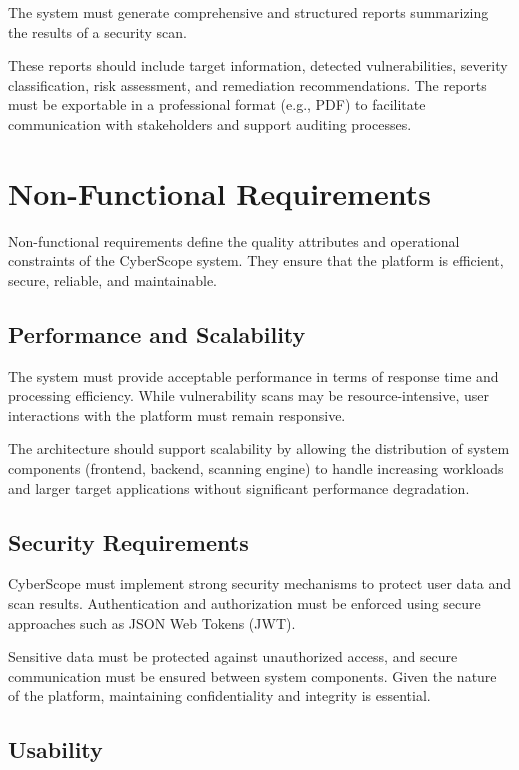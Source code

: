 \indent The system must generate comprehensive and structured reports summarizing the results of a security scan.

\indent These reports should include target information, detected vulnerabilities, severity classification, risk assessment, and remediation recommendations. The reports must be exportable in a professional format (e.g., PDF) to facilitate communication with stakeholders and support auditing processes.

\section{Non-Functional Requirements}

\indent Non-functional requirements define the quality attributes and operational constraints of the CyberScope system. They ensure that the platform is efficient, secure, reliable, and maintainable.

\subsection{Performance and Scalability}

\indent The system must provide acceptable performance in terms of response time and processing efficiency. While vulnerability scans may be resource-intensive, user interactions with the platform must remain responsive.

\indent The architecture should support scalability by allowing the distribution of system components (frontend, backend, scanning engine) to handle increasing workloads and larger target applications without significant performance degradation.

\subsection{Security Requirements}

\indent CyberScope must implement strong security mechanisms to protect user data and scan results. Authentication and authorization must be enforced using secure approaches such as JSON Web Tokens (JWT).

\indent Sensitive data must be protected against unauthorized access, and secure communication must be ensured between system components. Given the nature of the platform, maintaining confidentiality and integrity is essential.

\subsection{Usability}

